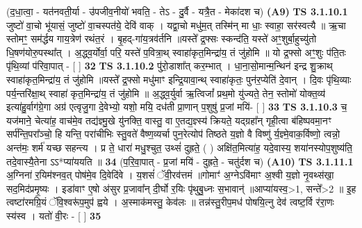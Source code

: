 \documentclass[17pt]{extarticle}
\begin{document}
                  \newline
                      (द॒धा॒त्वा॒ - यत॑नवती॒र्या - उ॑पजीव॒नीयो॑ भवति॒ - तेऽ - दु॒र्वै - यत्रै॒त - मेका॑दश च)  \textbf{(A9)} \newline \newline
                                        \textbf{ TS 3.1.10.1} \newline
                  जुष्टो॑ वा॒चो भू॑यासं॒ जुष्टो॑ वा॒चस्पत॑ये॒ देवि॑ वाक् । यद्वा॒चो मधु॑म॒त् तस्मि॑न् मा धाः॒ स्वाहा॒ सर॑स्वत्यै ॥ ऋ॒चा स्तोमꣳ॒॒ सम॑र्द्धय गाय॒त्रेण॑ रथंत॒रं । बृ॒हद्-गा॑य॒त्रव॑र्तनि ॥यस्ते᳚ द्र॒फ्सः स्कन्द॑ति॒ यस्ते॑ अꣳ॒॒शुर्बा॒हुच्यु॑तो धि॒षण॑योरु॒पस्था᳚त् । अ॒द्ध्व॒र्योर्वा॒ परि॒ यस्ते॑ प॒वित्रा॒थ् स्वाहा॑कृत॒मिन्द्रा॑य॒ तं जु॑होमि ॥ यो द्र॒फ्सो अꣳ॒॒शुः प॑ति॒तः पृ॑थि॒व्यां प॑रिवा॒पात् - [  ] \textbf{  32} \newline
                  \newline
                                \textbf{ TS 3.1.10.2} \newline
                  पु॑रो॒डाशा᳚त् कर॒म्भात् । धा॒ना॒सो॒मान्म॒न्थिन॑ इन्द्र शु॒क्राथ् स्वाहा॑कृत॒मिन्द्रा॑य॒ तं जु॑होमि ॥यस्ते᳚ द्र॒फ्सो मधु॑माꣳ इन्द्रि॒यावा॒न्थ् स्वाहा॑कृतः॒ पुन॑र॒प्येति॑ दे॒वान् । दि॒वः पृ॑थि॒व्याः पर्य॒न्तरि॑क्षा॒थ् स्वाहा॑ कृत॒मिन्द्रा॑य॒ तं जु॑होमि ॥ अ॒द्ध्व॒र्युर्वा ऋ॒त्विजां᳚ प्रथ॒मो यु॑ज्यते॒ तेन॒ स्तोमो॑ योक्त॒व्य॑ इत्या॑हु॒र्वाग॑ग्रे॒गा अग्र॑ एत्वृजु॒गा दे॒वेभ्यो॒ यशो॒ मयि॒ दध॑ती प्रा॒णान् प॒शुषु॑ प्र॒जां मयि॑- [  ] \textbf{  33} \newline
                  \newline
                                \textbf{ TS 3.1.10.3} \newline
                  च॒ यज॑माने॒ चेत्या॑ह॒ वाच॑मे॒व तद्य॑ज्ञ्मु॒खे यु॑नक्ति॒ वास्तु॒ वा ए॒तद्य॒ज्ञ्स्य॑ क्रियते॒ यद्ग्रहा᳚न् गृही॒त्वा ब॑हिष्पवमा॒नꣳ सर्प॑न्ति॒परा᳚ञ्चो॒ हि यन्ति॒ परा॑चीभिः स्तु॒वते॑ वैष्ण॒व्यर्चा पुन॒रेत्योप॑ तिष्ठते य॒ज्ञो वै विष्णु॑ र्य॒ज्ञ्मे॒वाक॒र्विष्णो॒ त्वन्नो॒ अन्त॑मः॒ शर्म॑ यच्छ सहन्त्य । प्र ते॒ धारा॑ मधु॒श्चुत॒ उथ्सं॑ दुह्रते॒ ( ) अक्षि॑त॒मित्या॑ह॒ यदे॒वास्य॒ शया॑नस्योप॒शुष्य॑ति॒ तदे॒वास्यै॒तेना ऽऽ*प्या॑ययति ॥ \textbf{  34} \newline
                  \newline
                      (प॒रि॒वा॒पात् - प्र॒जां मयि॑ - दुह्रते॒ - चतु॑र्दश च)  \textbf{(A10)} \newline \newline
                                        \textbf{ TS 3.1.11.1} \newline
                  अ॒ग्निना॑ र॒यिम॑श्नव॒त् पोष॑मे॒व दि॒वेदि॑वे । य॒शसं॑ ॅवी॒रव॑त्तमं ॥गोमाꣳ॑ अ॒ग्नेऽवि॑माꣳ अ॒श्वी य॒ज्ञो नृ॒वथ्स॑खा॒ सद॒मिद॑प्रमृ॒ष्यः । इडा॑वाꣳ ए॒षो अ॑सुर प्र॒जावा᳚न् दी॒र्घो र॒यिः पृ॑थुबु॒ध्नः स॒भावान्॑ ॥आप्या॑यस्व॒>1, सन्ते᳚>2 ॥ इ॒ह त्वष्टा॑रमग्रि॒यं ॅवि॒श्वरू॑प॒मुप॑ ह्वये । अ॒स्माक॑मस्तु॒ केव॑लः ॥ तन्न॑स्तु॒रीप॒मध॑ पोषयि॒त्नु देव॑ त्वष्ट॒र्वि र॑रा॒णः स्य॑स्व । यतो॑ वी॒रः - [  ] \textbf{  35} \newline
\end{document}
